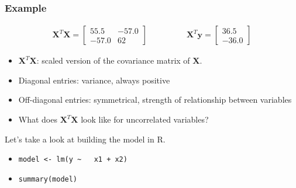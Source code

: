 \begin{frame}\frametitle{Example}

	$$
	\begin{array}{lr}
		\mathbf{X}^T\mathbf{X} =
		\begin{bmatrix}
			55.5 & -57.0 \\-57.0 & 62
		\end{bmatrix}
		&\qquad\qquad \mathbf{X}^T\mathbf{y} =
		\begin{bmatrix}
			36.5 \\
			-36.0
		\end{bmatrix}
	\end{array}
	$$
	\begin{itemize}
		\item	$\mathbf{X}^T\mathbf{X}$: scaled version of the covariance matrix of $\mathbf{X}$.
		\item	Diagonal entries: variance, always positive
		\item	Off-diagonal entries: symmetrical, strength of relationship between variables
		\item	What does $\mathbf{X}^T\mathbf{X}$ look like for uncorrelated variables?
	\end{itemize}
	\vspace{24pt}
	Let's take a look at building the model in R.
	\begin{itemize}
		\item	\texttt{model <- lm(y \textasciitilde\,\, x1 + x2)}
		\item	\texttt{summary(model)}
	\end{itemize}
\end{frame}

